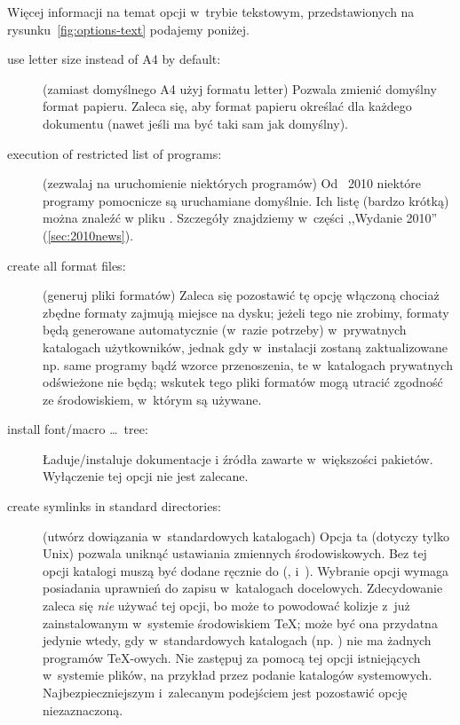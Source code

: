 \documentclass{article}
\begin{document}
Więcej informacji na temat opcji w~trybie tekstowym, przedstawionych na
rysunku~\ref{fig:options-text} podajemy poniżej.
\begin{description}
\item[use letter size instead of A4 by default:] (zamiast domyślnego A4 użyj  formatu
 letter) Pozwala zmienić domyślny format papieru. Zaleca się, aby format papieru
 określać  dla każdego dokumentu (nawet jeśli ma być taki sam jak domyślny).

\item[execution of restricted list of programs:] (zezwalaj na uruchomienie
 niektórych programów) Od \TL\ 2010 niektóre programy pomocnicze są uruchamiane domyślnie.
 Ich listę (bardzo krótką) można znaleźć w pliku  .
 Szczegóły znajdziemy w~części ,,Wydanie 2010'' (\ref{sec:2010news}).

\item[create all format files:] (generuj pliki formatów)
 Zaleca się pozostawić tę opcję włączoną chociaż zbędne formaty zajmują miejsce na dysku;
 jeżeli tego nie zrobimy, formaty będą generowane automatycznie (w~razie potrzeby)
 w~prywatnych katalogach  użytkowników, jednak gdy w~instalacji
 zostaną zaktualizowane np. same programy bądź wzorce przenoszenia, te w~katalogach
 prywatnych odświeżone nie będą; wskutek tego pliki formatów mogą utracić zgodność
 ze środowiskiem, w~którym są używane.

\item[install font/macro \ldots\ tree:]  Ładuje/instaluje dokumentacje i źródła
 zawarte w~większości pakietów.  Wyłączenie tej opcji nie jest zalecane.

\item[create symlinks in standard directories:] (utwórz dowiązania
 w~standardowych katalogach) Opcja ta (dotyczy tylko Unix)  pozwala
 uniknąć ustawiania zmiennych środowiskowych. Bez tej opcji katalogi \TL{}
 muszą być dodane  ręcznie do (,  i~).
 Wybranie opcji wymaga posiadania uprawnień do zapisu w~katalogach docelowych.
 Zdecydowanie zaleca się  \emph{nie} używać tej opcji, bo może to powodować
 kolizje z~już zainstalowanym w~systemie środowiskiem \TeX; może być
 ona przydatna jedynie wtedy, gdy w~standardowych katalogach
 (np. ) nie ma żadnych programów
 \TeX-owych. Nie zastępuj za pomocą tej opcji istniejących w~systemie
 plików, na przykład przez podanie katalogów
 systemowych. Najbezpieczniejszym i~zalecanym podejściem jest
 pozostawić opcję niezaznaczoną.


\end{description}
\end{document}
